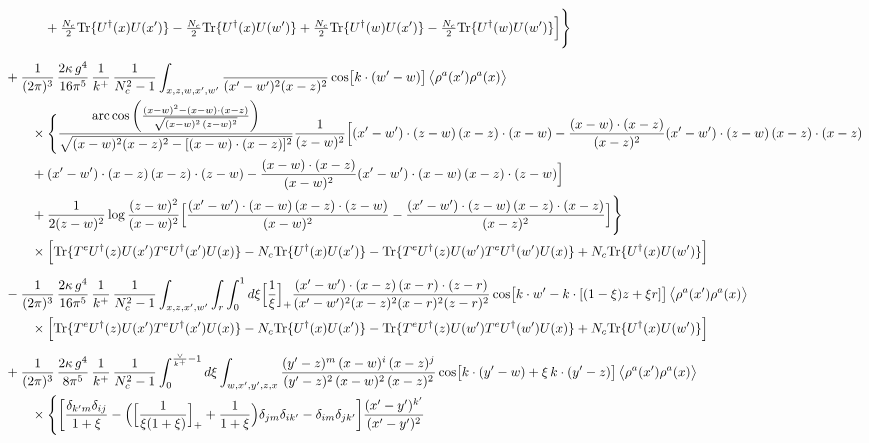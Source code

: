 \documentclass[10pt]{article}
\begin{document}
\begin{align}
&\qquad\quad+\tfrac{N_{c}}{2}{\rm Tr}\{U^{\dagger}(x)U(x')\}-\tfrac{N_{c}}{2}{\rm Tr}\{U^{\dagger}(x)U(w')\}+\tfrac{N_{c}}{2}{\rm Tr}\{U^{\dagger}(w)U(x')\}-\tfrac{N_{c}}{2}{\rm Tr}\{U^{\dagger}(w)U(w')\}\Big]\Bigg\}\notag\\[6pt]
&+\frac{1}{(2\pi)^{3}}\,\frac{2\kappa\,g^{4}}{16\pi^{5}}\,\frac{1}{k^{+}}\,\frac{1}{N_{c}^{2}-1}\int_{x,z,w,x',w'}\frac{}{(x'-w')^{2}(x-z)^{2}}\cos\!\big[k\cdot(w'-w)\big]\,\big\langle\rho^{a}(x')\rho^{a}(x)\big\rangle\notag\\
&\qquad\times\Bigg\{\frac{\mathrm{arc\,cos}\left(\frac{(x-w)^{2}-(x-w)\cdot (x-z)}{\sqrt{(x-w)^{2}\,(z-w)^{2}}}\right)}{\sqrt{(x-w)^{2}(x-z)^{2}-[(x-w)\cdot(x-z)]^{2}}}\frac{1}{(z-w)^{2}}\Big[(x'-w')\cdot(z-w)\,(x-z)\cdot(x-w)-\frac{(x-w)\cdot(x-z)}{(x-z)^{2}}(x'-w')\cdot(z-w)\,(x-z)\cdot(x-z)\notag\\
&\qquad+(x'-w')\cdot(x-z)\,(x-z)\cdot(z-w)-\frac{(x-w)\cdot(x-z)}{(x-w)^{2}}(x'-w')\cdot(x-w)\,(x-z)\cdot(z-w)\Big]\notag\\
&\qquad+\frac{1}{2(z-w)^{2}}\log\frac{(z-w)^{2}}{(x-w)^{2}}\Big[\frac{(x'-w')\cdot(x-w)\,(x-z)\cdot(z-w)}{(x-w)^{2}}-\frac{(x'-w')\cdot(z-w)\,(x-z)\cdot(x-z)}{(x-z)^{2}}\Big]\Bigg\}\notag\\
&\qquad\times\Big[{\rm Tr}\{T^{e}U^{\dagger}(z)U(x')T^{e}U^{\dagger}(x')U(x)\}-N_{c}{\rm Tr}\{U^{\dagger}(x)U(x')\}-{\rm Tr}\{T^{e}U^{\dagger}(z)U(w')T^{e}U^{\dagger}(w')U(x)\}+N_{c}{\rm Tr}\{U^{\dagger}(x)U(w')\}\Big]\notag\\[6pt]
&-\frac{1}{(2\pi)^{3}}\,\frac{2\kappa\,g^{4}}{16\pi^{5}}\,\frac{1}{k^{+}}\,\frac{1}{N_{c}^{2}-1}\int_{x,z,x',w'}\int_{r}\int_{0}^{1}d\xi\Big[\frac1\xi\Big]_{+}\frac{(x'-w')\cdot(x-z)\,(x-r)\cdot(z-r)}{(x'-w')^{2}(x-z)^{2}(x-r)^{2}(z-r)^{2}}\cos\!\big[k\cdot w'-k\cdot[(1-\xi)z+\xi r]\big]\,\big\langle\rho^{a}(x')\rho^{a}(x)\big\rangle\notag\\
&\qquad\times\Big[{\rm Tr}\{T^{e}U^{\dagger}(z)U(x')T^{e}U^{\dagger}(x')U(x)\}-N_{c}{\rm Tr}\{U^{\dagger}(x)U(x')\}-{\rm Tr}\{T^{e}U^{\dagger}(z)U(w')T^{e}U^{\dagger}(w')U(x)\}+N_{c}{\rm Tr}\{U^{\dagger}(x)U(w')\}\Big]\notag\\[6pt]
&+\frac{1}{(2\pi)^{3}}\,\frac{2\kappa\,g^{4}}{8\pi^{5}}\,\frac{1}{k^{+}}\,\frac{1}{N_{c}^{2}-1}\int_{0}^{\frac{\vee}{k^{+}}-1}d\xi\int_{w,x',y',z,x}\frac{(y'-z)^{m}\,(x-w)^{i}\,(x-z)^{j}}{(y'-z)^{2}\,(x-w)^{2}\,(x-z)^{2}}\cos\!\big[k\cdot(y'-w)+\xi\,k\cdot(y'-z)\big]\,\big\langle\rho^{a}(x')\rho^{a}(x)\big\rangle\notag\\
&\qquad\times\Bigg\{\bigg[\frac{\delta_{k'm}\delta_{ij}}{1+\xi}-\Big(\Big[\frac{1}{\xi(1+\xi)}\Big]_{+}+\frac{1}{1+\xi}\Big)\delta_{jm}\delta_{ik'}-\delta_{im}\delta_{jk'}\bigg]\frac{(x'-y')^{k'}}{(x'-y')^{2}}\notag\\

\end{align}
\end{document}
